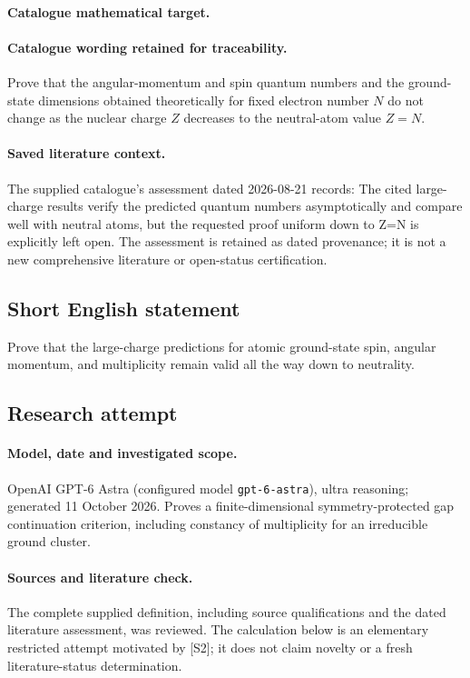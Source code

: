 \documentclass[11pt]{article}
\begin{document}
\paragraph{Catalogue mathematical target.}
\paragraph{Catalogue wording retained for traceability.}
Prove that the angular-momentum and spin quantum numbers and the ground-state dimensions obtained theoretically for fixed electron number $N$ do not change as the nuclear charge $Z$ decreases to the neutral-atom value $Z=N$.

\paragraph{Saved literature context.} The supplied catalogue's assessment dated 2026-08-21 records: The cited large-charge results verify the predicted quantum numbers asymptotically and compare well with neutral atoms, but the requested proof uniform down to Z=N is explicitly left open. The assessment is retained as dated provenance; it is not a new comprehensive literature or open-status certification.
\subsection{Short English statement}
Prove that the large-charge predictions for atomic ground-state spin, angular momentum, and multiplicity remain valid all the way down to neutrality.
\subsection{Research attempt}
\paragraph{Model, date and investigated scope.}
OpenAI GPT-6 Astra (configured model \texttt{gpt-6-astra}), ultra reasoning; generated 11 October 2026. Proves a finite-dimensional symmetry-protected gap continuation criterion, including constancy of multiplicity for an irreducible ground cluster.

\paragraph{Sources and literature check.}
The complete supplied definition, including source qualifications and the dated literature assessment, was reviewed. The calculation below is an elementary restricted attempt motivated by [S2]; it does not claim novelty or a fresh literature-status determination.
\end{document}
